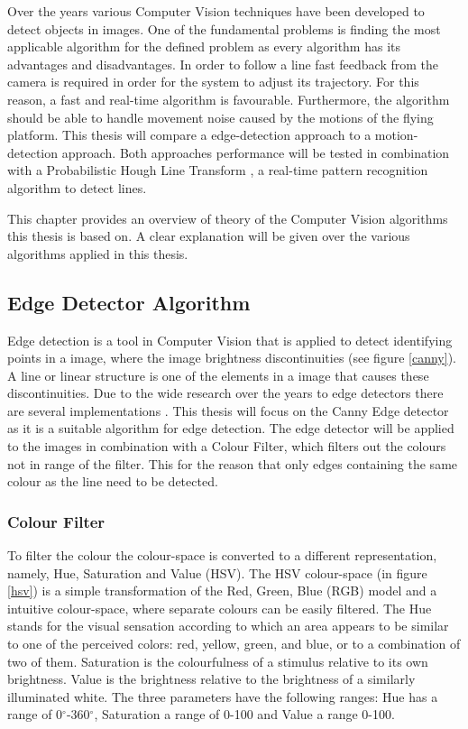 \documentclass[a4paper]{article}
\begin{document}
Over the years various Computer Vision techniques have been developed to detect objects in images. One of the fundamental problems is finding the most applicable algorithm for the defined problem as every algorithm has its advantages and disadvantages. In order to follow a line fast feedback from the camera is required in order for the system to adjust its trajectory. For this reason, a fast and real-time algorithm is favourable. Furthermore, the algorithm should be able to handle movement noise caused by the motions of the flying platform. This thesis will compare a edge-detection approach to a motion-detection approach. Both approaches performance will be tested in combination with a Probabilistic Hough Line Transform \cite{Kiryati1991}, a real-time pattern recognition algorithm to detect lines.

This chapter provides an overview of theory of the Computer Vision algorithms this thesis is based on. A clear explanation will be given over the various algorithms applied in this thesis.

\subsection{Edge Detector Algorithm}
Edge detection is a tool in Computer Vision that is applied to detect identifying points in a image, where the image brightness discontinuities (see figure \ref{canny}). A line or linear structure is one of the elements in a image that causes these discontinuities. Due to the wide research over the years to edge detectors there are several implementations \cite{Ziou1998}. This thesis will focus on the Canny Edge detector as it is a suitable algorithm for edge detection. The edge detector will be applied to the images in combination with a Colour Filter, which filters out the colours not in range of the filter. This for the reason that only edges containing the same colour as the line need to be detected.

\subsubsection{Colour Filter}
To filter the colour the colour-space is converted to a different representation, namely, Hue, Saturation and Value (HSV). The HSV colour-space (in figure \ref{hsv})  is a simple transformation of the Red, Green, Blue (RGB) model and a intuitive colour-space, where separate colours can be easily filtered. The Hue stands for the visual sensation according to which an area appears to be similar to one of the perceived colors: red, yellow, green, and blue, or to a combination of two of them. Saturation is the colourfulness of a stimulus relative to its own brightness. Value is the brightness relative to the brightness of a similarly illuminated white. The three parameters have the following ranges: Hue has a range of 0$^{\circ}$-360$^{\circ}$, Saturation a range of 0-100 and Value a range 0-100.
\end{document}
